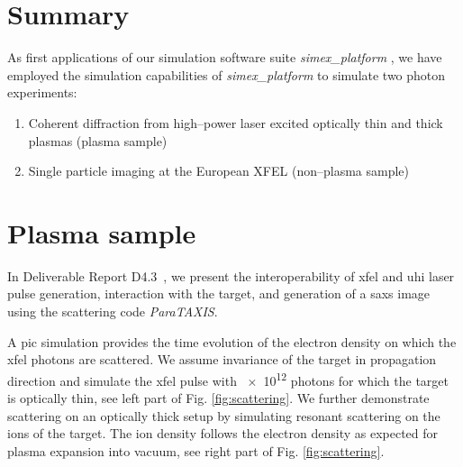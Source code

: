 \documentclass[10pt]{scrartcl}
\begin{document}

\section{Summary}
%
As first applications of our simulation software suite \textit{simex\_platform}
\cite{simex_github, Fortmann-Grote2017a, EUCALL_SIMEX_D4.3}, we have employed the simulation capabilities of
\textit{simex\_platform} \cite{simex_github} to simulate two photon experiments:
\begin{enumerate}
  \item Coherent diffraction from high--power laser excited optically thin and
    thick plasmas (plasma sample)
  \item Single particle imaging at the European XFEL (non--plasma sample)
\end{enumerate}

\section{Plasma sample}

In Deliverable Report D4.3~\cite{EUCALL_SIMEX_D4.3}, we present the interoperability of \gls{xfel} and \gls{uhi} laser pulse generation,
interaction with the target, and generation of a \gls{saxs} image using the
scattering code \textit{ParaTAXIS}.

A \gls{pic} simulation provides the time
evolution of the electron density on which the \gls{xfel} photons are scattered. We
assume invariance of the target in propagation direction and simulate the \gls{xfel}
pulse with \num{e12} photons for which the target is optically thin,
see left part of Fig. \ref{fig:scattering}. We further demonstrate
scattering on an optically thick setup by simulating
resonant scattering on the ions of the target. The ion density follows the
electron density as expected for plasma expansion into vacuum\cite{Mora2003},
see right part of Fig. \ref{fig:scattering}.
\end{document}
